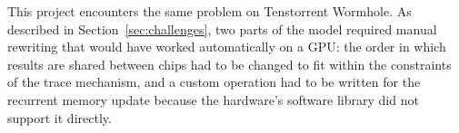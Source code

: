 This project encounters the same problem on Tenstorrent Wormhole. As described in Section~\ref{sec:challenges}, two parts of the model required manual rewriting that would have worked automatically on a GPU: the order in which results are shared between chips had to be changed to fit within the constraints of the trace mechanism, and a custom operation had to be written for the recurrent memory update because the hardware's software library did not support it directly.
